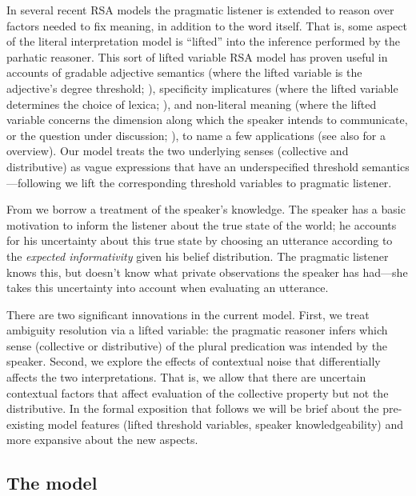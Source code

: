 \documentclass[linguex]{sp}
\begin{document}
In several recent RSA models the pragmatic listener is extended to reason over factors needed to fix meaning, in addition to the word itself. 
That is, some aspect of the literal interpretation model is ``lifted'' into the inference performed by the parhatic reasoner.
This sort of lifted variable RSA model has proven useful in accounts of gradable adjective semantics (where the lifted variable is the adjective's degree threshold; \citealp{lassitergoodman2013}), specificity implicatures (where the lifted variable determines the choice of lexica; \citealp{bergenetal2012}), and non-literal meaning (where the lifted variable concerns the dimension along which the speaker intends to communicate, or the question under discussion; \citealp{kaoetal2014}), to name a few applications (see also \citealp{goodmanlassiter2015} for a overview). Our model treats the two underlying senses (collective and distributive) as vague expressions that have an underspecified threshold semantics---following \citealp{lassitergoodman2013} we lift the corresponding threshold variables to pragmatic listener.

From \citealp{goodmanstuhlmuller2013} we borrow a treatment of the speaker's knowledge. The speaker has a basic motivation to inform the listener about the true state of the world; he accounts for his uncertainty about this true state by choosing an utterance according to the \emph{expected informativity} given his belief distribution. The pragmatic listener knows this, but doesn't know what private observations the speaker has had---she takes this uncertainty into account when evaluating an utterance.

There are two significant innovations in the current model. First, we treat ambiguity resolution via a lifted variable: the pragmatic reasoner infers which sense (collective or distributive) of the plural predication was intended by the speaker. Second, we explore the effects of contextual noise that differentially affects the two interpretations. That is, we allow that there are uncertain contextual factors that affect evaluation of the collective property but not the distributive. 
In the formal exposition that follows we will be brief about the pre-existing model features (lifted threshold variables, speaker knowledgeability) and more expansive about the new aspects.

\subsection{The model}
\end{document}
